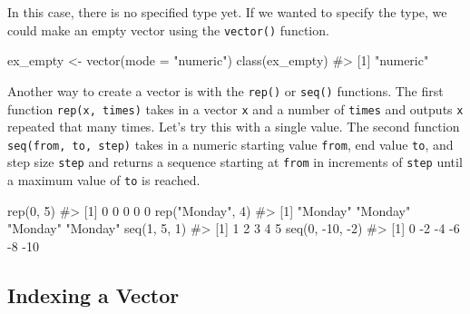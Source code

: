 \documentclass[
  letterpaper,
]{latex/krantz}
\makeatletter
\newenvironment{Shaded}{\begin{snugshade}}{\end{snugshade}}
\newcommand{\AttributeTok}[1]{\textcolor[rgb]{0.40,0.45,0.13}{#1}}
\newcommand{\CommentTok}[1]{\textcolor[rgb]{0.37,0.37,0.37}{#1}}
\newcommand{\DecValTok}[1]{\textcolor[rgb]{0.68,0.00,0.00}{#1}}
\newcommand{\FunctionTok}[1]{\textcolor[rgb]{0.28,0.35,0.67}{#1}}
\newcommand{\NormalTok}[1]{\textcolor[rgb]{0.00,0.23,0.31}{#1}}
\newcommand{\OtherTok}[1]{\textcolor[rgb]{0.00,0.23,0.31}{#1}}
\newcommand{\SpecialCharTok}[1]{\textcolor[rgb]{0.37,0.37,0.37}{#1}}
\newcommand{\StringTok}[1]{\textcolor[rgb]{0.13,0.47,0.30}{#1}}
\newenvironment{kframe}{%
\medskip{}
\setlength{\fboxsep}{.8em}
 \def\at@end@of@kframe{}%
 \ifinner\ifhmode%
  \def\at@end@of@kframe{\end{minipage}}%
  \begin{minipage}{\columnwidth}%
 \fi\fi%
 \def\FrameCommand##1{\hskip\@totalleftmargin \hskip-\fboxsep
 \colorbox{shadecolor}{##1}\hskip-\fboxsep
     \hskip-\linewidth \hskip-\@totalleftmargin \hskip\columnwidth}%
 \MakeFramed {\advance\hsize-\width
   \@totalleftmargin\z@ \linewidth\hsize
   \@setminipage}}%
 {\par\unskip\endMakeFramed%
 \at@end@of@kframe}
\renewenvironment{Shaded}{\begin{kframe}}{\end{kframe}}
\makeatother
\begin{document}
In this case, there is no specified type yet. If we wanted to specify
the type, we could make an empty vector using the
\texttt{vector()}
function.

\begin{Shaded}
\begin{Highlighting}[]
\NormalTok{ex\_empty }\OtherTok{\textless{}{-}} \FunctionTok{vector}\NormalTok{(}\AttributeTok{mode =} \StringTok{"numeric"}\NormalTok{)}
\FunctionTok{class}\NormalTok{(ex\_empty)}
\CommentTok{\#\textgreater{} [1] "numeric"}
\end{Highlighting}
\end{Shaded}

Another way to create a vector is with the
\texttt{rep()} or
\texttt{seq()} functions. The
first function \texttt{rep(x,\ times)} takes in a vector \texttt{x} and
a number of \texttt{times} and outputs \texttt{x} repeated that many
times. Let's try this with a single value. The second function
\texttt{seq(from,\ to,\ step)} takes in a numeric starting value
\texttt{from}, end value \texttt{to}, and step size \texttt{step} and
returns a sequence starting at \texttt{from} in increments of
\texttt{step} until a maximum value of \texttt{to} is reached.

\begin{Shaded}
\begin{Highlighting}[]
\FunctionTok{rep}\NormalTok{(}\DecValTok{0}\NormalTok{, }\DecValTok{5}\NormalTok{)}
\CommentTok{\#\textgreater{} [1] 0 0 0 0 0}
\FunctionTok{rep}\NormalTok{(}\StringTok{"Monday"}\NormalTok{, }\DecValTok{4}\NormalTok{)}
\CommentTok{\#\textgreater{} [1] "Monday" "Monday" "Monday" "Monday"}
\FunctionTok{seq}\NormalTok{(}\DecValTok{1}\NormalTok{, }\DecValTok{5}\NormalTok{, }\DecValTok{1}\NormalTok{)}
\CommentTok{\#\textgreater{} [1] 1 2 3 4 5}
\FunctionTok{seq}\NormalTok{(}\DecValTok{0}\NormalTok{, }\SpecialCharTok{{-}}\DecValTok{10}\NormalTok{, }\SpecialCharTok{{-}}\DecValTok{2}\NormalTok{)}
\CommentTok{\#\textgreater{} [1]   0  {-}2  {-}4  {-}6  {-}8 {-}10}
\end{Highlighting}
\end{Shaded}

\subsection{\texorpdfstring{Indexing a Vector
}{Indexing a Vector }}\label{indexing-a-vector}
\end{document}
